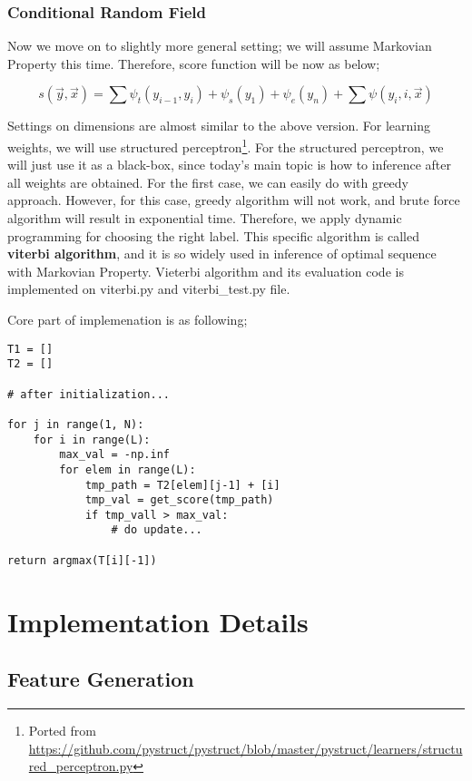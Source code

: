 \documentclass[twoside]{article}
\begin{document}
\subsubsection{Conditional Random Field}

Now we move on to slightly more general setting; we will assume Markovian Property this time. Therefore, score function will be now as below; 

\begin{equation} 
s(\vec{y}, \vec{x}) = \sum \psi_t (y_{i-1}, y_i) + \psi_s(y_1) + \psi_e(y_n) + \sum \psi(y_i, i, \vec{x})
\end{equation}

Settings on dimensions are almost similar to the above version. For learning weights, we will use structured perceptron\footnote{Ported from \url{https://github.com/pystruct/pystruct/blob/master/pystruct/learners/structured_perceptron.py}}. 
For the structured perceptron, we will just use it as a black-box, since today's main topic is how to inference after all weights are obtained. For the first case, we can easily do with greedy approach. However, for this case, greedy algorithm will not work, and brute force algorithm will result in exponential time. Therefore, we apply dynamic programming for choosing the right label. This specific algorithm is called \textbf{viterbi algorithm}, and it is so widely used in inference of optimal sequence with Markovian Property. Vieterbi algorithm and its evaluation code is implemented on viterbi.py and viterbi\_test.py file. 
 
 
Core part of implemenation is as following; 

\begin{lstlisting} 
T1 = []
T2 = []

# after initialization... 

for j in range(1, N):
	for i in range(L):
		max_val = -np.inf
		for elem in range(L):
			tmp_path = T2[elem][j-1] + [i]
			tmp_val = get_score(tmp_path)
			if tmp_vall > max_val:
				# do update... 

return argmax(T[i][-1])
\end{lstlisting}

\section{Implementation Details} 

\subsection{Feature Generation} 
\end{document}
